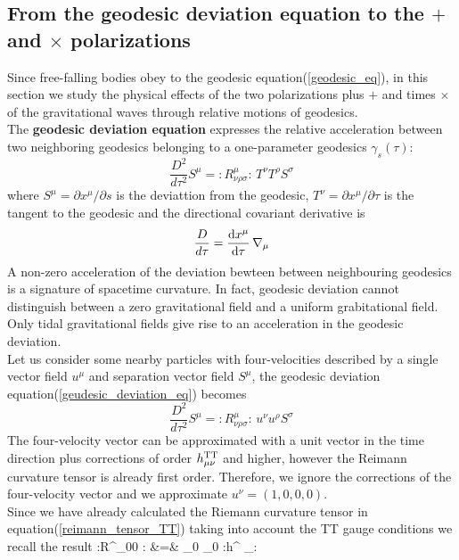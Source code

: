 \subsection{From the geodesic deviation equation to the $+$ and $\times$ polarizations}
Since free-falling bodies obey to the geodesic equation(\ref{geodesic_eq}), in this section we study the physical effects of the two polarizations plus $+$ and times $\times$ of the gravitational waves through relative motions of geodesics.\\
The \textbf{geodesic deviation equation}  expresses the relative acceleration between two neighboring geodesics belonging to a one-parameter geodesics $\gamma_s (\tau)$:
\begin{equation}
\label{geudesic_deviation_eq}
\dfrac{D^2}{d \tau ^2} S^{\mu} = :R^{\mu} _{\nu \rho \sigma}: \, T^{\nu} T^{\rho} S^{\sigma}
\end{equation}
 where $S^{\mu} = \partial x^{\mu} / \partial s$ is the deviattion from the geodesic, $T^{\nu} = \partial x^{\mu} / \partial \tau$ is the tangent to the geodesic and the directional covariant derivative is 
\[
\dfrac{D}{d \tau} = \dv{x^{\mu}}{\tau} \, \nabla_{\mu}
\]
A non-zero acceleration of the deviation bewteen between neighbouring geodesics is a signature of spacetime curvature.
In fact, geodesic deviation cannot distinguish between a zero gravitational field and a uniform grabitational field. Only tidal gravitational fields give rise to an acceleration in the geodesic deviation. \\
Let us consider some nearby particles with four-velocities described by a single vector field $u^{\mu}$ and separation vector field $S^{\mu}$, the geodesic deviation equation(\ref{geudesic_deviation_eq}) becomes
\begin{equation}
\dfrac{D^2}{d \tau ^2} S^{\mu} = :R^{\mu} _{\nu \rho \sigma}: \, u^{\nu} u^{\rho} S^{\sigma}
\end{equation}
The four-velocity vector can be approximated with a unit vector in the time direction plus corrections of order $h^{\text{TT}} _{\mu \nu}$ and higher, however the Reimann curvature tensor is already first order. Therefore, we ignore the corrections of the four-velocity vector and we approximate $u^{\nu} =(1,0,0,0)$.\\
Since we have already calculated the Riemann curvature tensor in equation(\ref{reimann_tensor_TT}) taking into account the TT gauge conditions we recall the result
\bea
:R^\mu _{00 \sigma }: 
&=&
 \partial_0 \partial_0 :h^{\T \mu} _{\sigma}: 
\eea 
